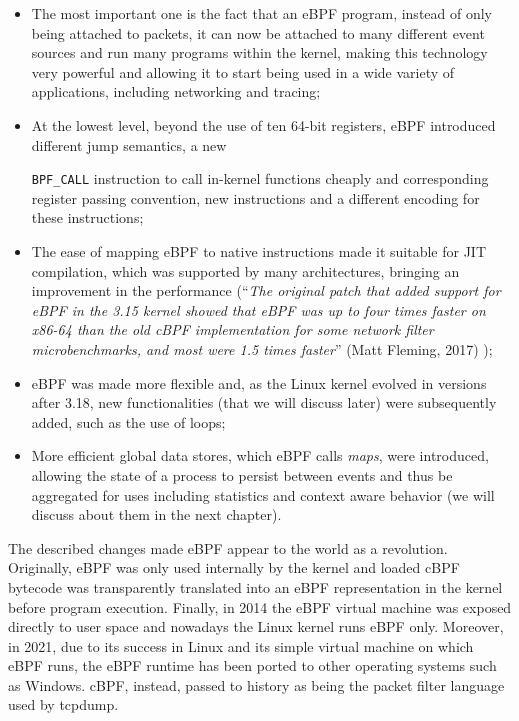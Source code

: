 \begin{itemize}
	\item 
		The most important one is the fact that an eBPF program, instead of only being attached to packets, it can now be attached to many different event sources and run many programs within the kernel, making this technology very powerful and allowing it to start being used in a wide variety of applications, including networking and tracing;
	\item 
		At the lowest level, beyond the use of ten 64-bit registers, eBPF introduced different jump semantics, a new \raggedright\colorbox{backcolour}{\lstinline[style=commandline, language=bash]|BPF_CALL|} instruction to call in-kernel functions cheaply and corresponding register passing convention, new instructions and a different encoding for these instructions;
	\item 
		The ease of mapping eBPF to native instructions made it suitable for JIT compilation, which was supported by many architectures, bringing an improvement in the performance (``\textit{The original patch that added support for eBPF in the 3.15 kernel showed that eBPF was up to four times faster on x86-64 than the old cBPF implementation for some network filter microbenchmarks, and most were 1.5 times faster}'' (Matt Fleming, 2017) \cite{eBPFThroughIntroduction});
	\item 
		eBPF was made more flexible and, as the Linux kernel evolved in versions after 3.18, new functionalities (that we will discuss later) were subsequently added, such as the use of loops;
	\item 
		More efficient global data stores, which eBPF calls \textit{maps}, were introduced, allowing the state of a process to persist between events and thus be aggregated for uses including statistics and context aware behavior (we will discuss about them in the next chapter).
\end{itemize}

The described changes made eBPF appear to the world as a revolution.
Originally, eBPF was only used internally by the kernel and loaded cBPF bytecode was transparently translated into an eBPF representation in the kernel before program execution.
Finally, in 2014 the eBPF virtual machine was exposed directly to user space and nowadays the Linux kernel runs eBPF only.
Moreover, in 2021, due to its success in Linux and its simple virtual machine on which eBPF runs, the eBPF runtime has been ported to other operating systems such as Windows.
cBPF, instead, passed to history as being the packet filter language used by tcpdump.

